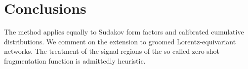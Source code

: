 \section{Conclusions}\label{sec:conclusions}

The method applies equally to Sudakov form factors and calibrated
cumulative distributions. We comment on the extension to groomed
Lorentz-equivariant networks. The treatment of the signal regions of the
so-called zero-shot fragmentation function is admittedly heuristic.

